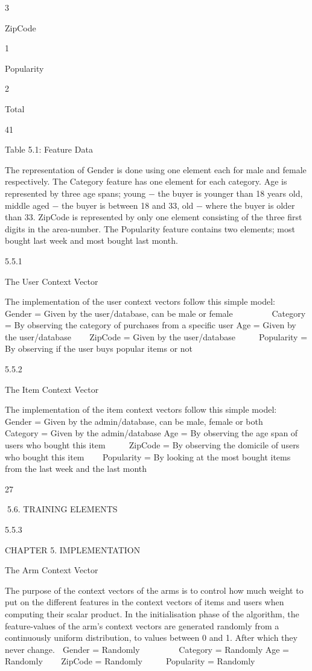 3

ZipCode

1

Popularity

2

Total

41

Table 5.1: Feature Data

The representation of Gender is done using one element each for male and female respectively. The Category feature has one element for each category. Age is represented
by three age spans; young − the buyer is younger than 18 years old, middle aged −
the buyer is between 18 and 33, old − where the buyer is older than 33. ZipCode is
represented by only one element consisting of the three first digits in the area-number.
The Popularity feature contains two elements; most bought last week and most bought
last month.

5.5.1

The User Context Vector

The implementation of the user context vectors follow this simple model:

Gender = Given by the user/database, can be male or female






 Category = By observing the category of purchases from a specific user
Age = Given by the user/database



ZipCode = Given by the user/database




Popularity = By observing if the user buys popular items or not

5.5.2

The Item Context Vector

The implementation of the item context vectors follow this simple model:

Gender = Given by the admin/database, can be male, female or both






 Category = Given by the admin/database
Age = By observing the age span of users who bought this item



 ZipCode = By observing the domicile of users who bought this item



Popularity = By looking at the most bought items from the last week and the last month

27

5.6. TRAINING ELEMENTS

5.5.3

CHAPTER 5. IMPLEMENTATION

The Arm Context Vector

The purpose of the context vectors of the arms is to control how much weight to put
on the different features in the context vectors of items and users when computing their
scalar product. In the initialisation phase of the algorithm, the feature-values of the
arm’s context vectors are generated randomly from a continuously uniform distribution,
to values between 0 and 1. After which they never change.

Gender = Randomly






 Category = Randomly
Age = Randomly



ZipCode = Randomly




Popularity = Randomly

